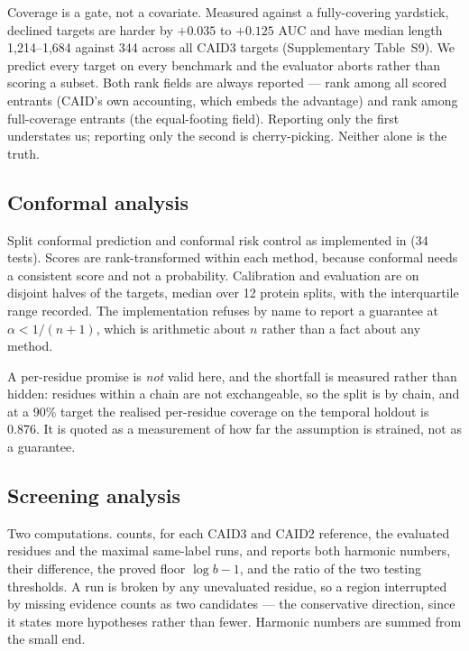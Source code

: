 Coverage is a gate, not a covariate. Measured against a fully-covering yardstick,
declined targets are harder by $+0.035$ to $+0.125$ AUC and have median length
1{,}214--1{,}684 against 344 across all CAID3 targets (Supplementary Table~S9).
We predict every target on every benchmark and the evaluator aborts rather than
scoring a subset. Both rank fields are always reported --- rank among all scored
entrants (CAID's own accounting, which embeds the advantage) and rank among
full-coverage entrants (the equal-footing field). Reporting only the first
understates us; reporting only the second is cherry-picking. Neither alone is the
truth.

\subsection*{Conformal analysis}

Split conformal prediction\cite{vovk} and conformal risk control\cite{crc} as
implemented in  (34 tests). Scores are rank-transformed
within each method, because conformal needs a consistent score and not a
probability. Calibration and evaluation are on disjoint halves of the targets,
median over 12 protein splits, with the interquartile range recorded. The
implementation refuses by name to report a guarantee at $\alpha < 1/(n{+}1)$,
which is arithmetic about $n$ rather than a fact about any method.

A per-residue promise is \emph{not} valid here, and the shortfall is measured
rather than hidden: residues within a chain are not exchangeable, so the split
is by chain, and at a 90\% target the realised per-residue coverage on the
temporal holdout is 0.876. It is quoted as a measurement of how far the
assumption is strained, not as a guarantee.

\subsection*{Screening analysis}

Two computations.  counts, for each CAID3 and CAID2
reference, the evaluated residues and the maximal same-label runs, and reports
both harmonic numbers, their difference, the proved floor $\log b - 1$, and the
ratio of the two testing thresholds. A run is broken by any unevaluated residue,
so a region interrupted by missing evidence counts as two candidates --- the
conservative direction, since it states more hypotheses rather than fewer.
Harmonic numbers are summed from the small end.

